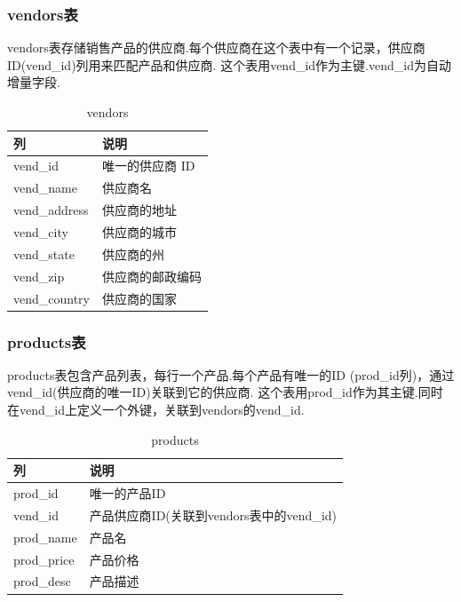 \subsubsection{vendors表}
vendors表存储销售产品的供应商.每个供应商在这个表中有一个记录，供应商ID(vend\_id)列用来匹配产品和供应商.
这个表用vend\_id作为主键.vend\_id为自动增量字段.

\begin{table}[H]
  \caption{vendors}
  \begin{center}
    \begin{tabular}[c]{|l|l|}
      \hline
      列 & 说明 \\
      \hline
      vend\_id & 唯一的供应商 ID \\
      \hline
      vend\_name & 供应商名 \\
      \hline
      vend\_address & 供应商的地址 \\
      \hline
      vend\_city & 供应商的城市 \\
      \hline
      vend\_state & 供应商的州 \\
      \hline
      vend\_zip & 供应商的邮政编码 \\
      \hline
      vend\_country & 供应商的国家 \\
      \hline
    \end{tabular}
  \end{center}
\end{table}

\subsubsection{products表}
products表包含产品列表，每行一个产品.每个产品有唯一的ID
(prod\_id列)，通过vend\_id(供应商的唯一ID)关联到它的供应商.
这个表用prod\_id作为其主键.同时在vend\_id上定义一个外键，关联到vendors的vend\_id.

\begin{table}[H]
  \caption{products}
  \begin{center}
    \begin{tabular}[c]{|l|l|}
      \hline
      列 & 说明 \\
      \hline
      prod\_id & 唯一的产品ID \\
      \hline
      vend\_id & 产品供应商ID(关联到vendors表中的vend\_id) \\
      \hline
      prod\_name & 产品名 \\
      \hline
      prod\_price & 产品价格 \\
      \hline
      prod\_desc & 产品描述 \\
      \hline
    \end{tabular}
  \end{center}
\end{table}


